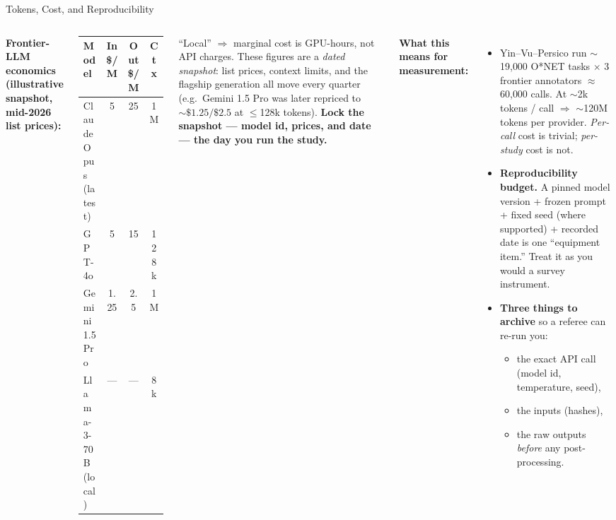 \begin{frame}{Tokens, Cost, and Reproducibility}
\small
\begin{columns}[T]
\textbf{Frontier-LLM economics (illustrative snapshot, mid-2026 list prices):}
\medskip

\renewcommand{\arraystretch}{1.2}
\footnotesize
\begin{tabular}{|l|c|c|c|}
\hline
\textbf{Model} & \textbf{In \$/M} & \textbf{Out \$/M} & \textbf{Ctx} \\
\hline
Claude Opus (latest) & 5 & 25 & 1M \\
\hline
GPT-4o & 5 & 15 & 128k \\
\hline
Gemini 1.5 Pro & 1.25 & 2.5 & 1M \\
\hline
Llama-3-70B (local) & --- & --- & 8k \\
\hline
\end{tabular}

\smallskip
\scriptsize ``Local'' $\Rightarrow$ marginal cost is GPU-hours, not API charges. These figures are a \emph{dated snapshot}: list prices, context limits, and the flagship generation all move every quarter (e.g.\ Gemini 1.5 Pro was later repriced to $\sim\$1.25/\$2.5$ at $\le$128k tokens). \textbf{Lock the snapshot --- model id, prices, and date --- the day you run the study.}

\textbf{What this means for measurement:}
\footnotesize
\begin{itemize}
\item Yin--Vu--Persico run $\sim$19{,}000 O*NET tasks $\times$ 3 frontier annotators $\approx$ 60{,}000 calls. At $\sim$2k tokens / call $\Rightarrow$ $\sim$120M tokens per provider. \emph{Per-call} cost is trivial; \emph{per-study} cost is not.

\medskip
\item \textbf{Reproducibility budget.} A pinned model version + frozen prompt + fixed seed (where supported) + recorded date is one ``equipment item.'' Treat it as you would a survey instrument.

\medskip
\item \textbf{Three things to archive} so a referee can re-run you:
\begin{itemize}\itemsep0pt
\item the exact API call (model id, temperature, seed),
\item the inputs (hashes),
\item the raw outputs \emph{before} any post-processing.
\end{itemize}
\end{itemize}
\end{columns}
\end{frame}

